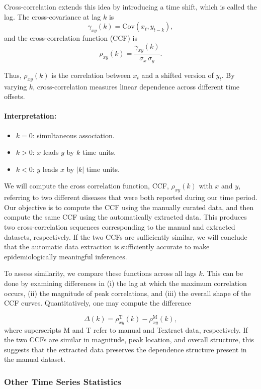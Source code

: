 \documentclass[12pt]{article}
\begin{document}
Cross-correlation extends this idea by introducing a time shift, which is called the lag. 
The cross-covariance at lag $k$ is
\[
\gamma_{xy}(k) = \mathrm{Cov}(x_t, y_{t-k}),
\]
and the cross-correlation function (CCF) is
\[
\rho_{xy}(k) = 
\frac{\gamma_{xy}(k)}{\sigma_x \, \sigma_y}.
\]

Thus, $\rho_{xy}(k)$ is the correlation between $x_t$ and a shifted version of $y_t$. 
By varying $k$, cross-correlation measures linear dependence across different time offsets.

\paragraph{Interpretation:}
\begin{itemize}
    \item $k = 0$: simultaneous association.
    \item $k > 0$: $x$ leads $y$ by $k$ time units.
    \item $k < 0$: $y$ leads $x$ by $|k|$ time units.
\end{itemize}



We will compute the cross correlation function, CCF, $\rho_{xy}(k)$ with $x$ and $y$, referring to two different diseases that were both reported during our time period. Our objective is to compute the CCF using the manually curated data, and then compute the same CCF using the automatically extracted data. This produces two cross-correlation sequences corresponding to the manual and extracted datasets, respectively. If the two CCFs are sufficiently similar, we will conclude that the automatic data extraction is sufficiently accurate to make epidemiologically meaningful inferences.


To assess similarity, we compare these functions across all lags $k$. This can be done by examining differences in (i) the lag at which the maximum correlation occurs, (ii) the magnitude of peak correlations, and (iii) the overall shape of the CCF curves. Quantitatively, one may compute the difference 


\[
\Delta(k) = \rho_{xy}^{\mathrm{T}}(k) - \rho_{xy}^{\mathrm{M}}(k),
\]
where superscripts M and T refer to manual and Textract data, respectively.  If the two CCFs are similar in magnitude, peak location, and overall structure, this suggests that the extracted data preserves the dependence structure present in the manual dataset.


\subsubsection{Other Time Series Statistics}
\end{document}
